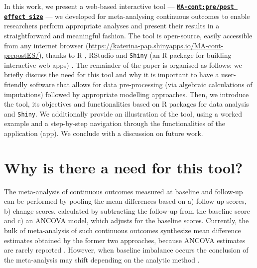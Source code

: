 \documentclass[AMA,STIX1COL]{WileyNJD-v2}
\begin{document}
In this work, we present a web-based interactive tool — \href{https://katerina-pap.shinyapps.io/MA-cont-prepostES/}{\textbf{\texttt{MA-cont:pre/post effect size}}} — we developed for meta-analysing continuous outcomes to enable researchers perform appropriate analyses and present their results in a straightforward and meaningful fashion. The tool is open-source, easily accessible from any internet browser (\url{https://katerina-pap.shinyapps.io/MA-cont-prepostES/}), thanks to R \citep{RCoreTeam2020}, RStudio \citep{Rstudiocite} and \texttt{Shiny} (an R package for building interactive web apps) \citep{chang2017shiny}. The remainder of the paper is organised as follows: we briefly discuss the need for this tool and why it is important to have a user-friendly software that allows for data pre-processing (via algebraic calculations of imputations) followed by appropriate modelling approaches. Then, we introduce the tool, its objectives and functionalities based on R packages for data analysis and \texttt{Shiny}. We additionally provide an illustration of the tool, using a worked example and a step-by-step navigation through the functionalities of the application (app). We conclude with a discussion on future work.

\section{Why is there a need for this tool?}

The meta-analysis of continuous outcomes measured at baseline and follow-up can be performed by pooling the mean differences based on a) follow-up scores, b) change scores, calculated by subtracting the follow-up from the baseline score and c) an ANCOVA model, which adjusts for the baseline scores. Currently, the bulk of meta-analysis of such continuous outcomes synthesize mean difference estimates obtained by the former two approaches, because ANCOVA estimates are rarely reported \citep{austin2010substantial}. However, when baseline imbalance occurs the conclusion of the meta-analysis may shift depending on the analytic method \citep{fu2016change}.
\end{document}
